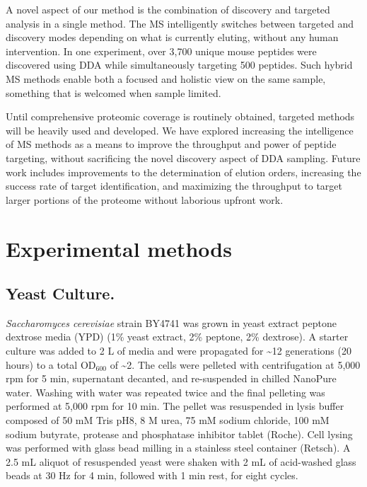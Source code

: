A novel aspect of our method is the combination of discovery and targeted analysis in a single method. The MS intelligently switches between targeted and discovery modes depending on what is currently eluting, without any human intervention. In one experiment, over 3,700 unique mouse peptides were discovered using DDA while simultaneously targeting 500 peptides. Such hybrid MS methods enable both a focused and holistic view on the same sample, something that is welcomed when sample limited. 

Until comprehensive proteomic coverage is routinely obtained, targeted methods will be heavily used and developed. We have explored increasing the intelligence of MS methods as a means to improve the throughput and power of peptide targeting, without sacrificing the novel discovery aspect of DDA sampling. Future work includes improvements to the determination of elution orders, increasing the success rate of target identification, and maximizing the throughput to target larger portions of the proteome without laborious upfront work.

\section{Experimental methods}

\subsection*{Yeast Culture.}
\emph{Saccharomyces cerevisiae} strain BY4741 was grown in yeast extract peptone dextrose media (YPD) (1\% yeast extract, 2\% peptone, 2\% dextrose). A starter culture was added to 2 L of media and were propagated for \textasciitilde12 generations (20 hours) to a total OD$_{600}$ of \textasciitilde2. The cells were pelleted with centrifugation at 5,000 rpm for 5 min, supernatant decanted, and re-suspended in chilled NanoPure water. Washing with water was repeated twice and the final pelleting was performed at 5,000 rpm for 10 min. The pellet was resuspended in lysis buffer composed of 50 mM Tris pH8, 8 M urea, 75 mM sodium chloride, 100 mM sodium butyrate, protease and phosphatase inhibitor tablet (Roche). Cell lysing was performed with glass bead milling in a stainless steel container (Retsch). A 2.5 mL aliquot of resuspended yeast were shaken with 2 mL of acid-washed glass beads at 30 Hz for 4 min, followed with 1 min rest, for eight cycles.

